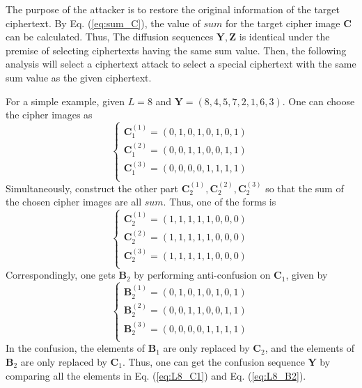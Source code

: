 \documentclass[final,3p,times,twocolumn]{elsarticle}
\begin{document}
The purpose of the attacker is to restore the original information of the target ciphertext. By Eq. (\ref{eq:sum_C}), the value of $sum$ for the target cipher image $\bm{C}$ can be calculated. Thus, The diffusion sequences $\bm{Y},\bm{Z}$ is identical under the premise of selecting ciphertexts having the same sum value. Then, the following analysis will select a ciphertext attack to select a special ciphertext with the same sum value as the given ciphertext.

For a simple example, given $L=8$ and $\bm{Y}=(8,4,5,7,2,1,6,3)$. One can choose the cipher images as
\begin{equation}
	\left\{ \begin{array}{l}
		\bm{C}_1^{(1)} = (0,1,0,1,0,1,0,1) \\
		\bm{C}_1^{(2)} = (0,0,1,1,0,0,1,1) \\
		\bm{C}_1^{(3)} = (0,0,0,0,1,1,1,1) \\
	\end{array} \right.
	\label{eq:L8_C1}
\end{equation}
Simultaneously, construct the other part $\bm{C}_2^{(1)},\bm{C}_2^{(2)},\bm{C}_2^{(3)}$ so that the sum of the chosen cipher images are all $sum$. Thus, one of the forms is
\begin{equation}
	\left\{ \begin{array}{l}
		\bm{C}_2^{(1)} = (1,1,1,1,1,0,0,0) \\
		\bm{C}_2^{(2)} = (1,1,1,1,1,0,0,0) \\
		\bm{C}_2^{(3)} = (1,1,1,1,1,0,0,0) \\
	\end{array} \right.
	\label{eq:L8_C2}
\end{equation}
Correspondingly, one gets $\bm{B}_2$ by performing anti-confusion on $\bm{C}_1$, given by
\begin{equation}
\left\{ \begin{array}{l}
\bm{B}_2^{(1)} = (0,1,0,1,0,1,0,1) \\
\bm{B}_2^{(2)} = (0,0,1,1,0,0,1,1) \\
\bm{B}_2^{(3)} = (0,0,0,0,1,1,1,1) \\
\end{array} \right.
\label{eq:L8_B2}
\end{equation}
In the confusion, the elements of $\bm{B}_1$ are only replaced by $\bm{C}_2$, and the elements of $\bm{B}_2$ are only replaced by $\bm{C}_1$. Thus, one can get the confusion sequence $\bm{Y}$ by comparing all the elements in Eq. (\ref{eq:L8_C1}) and Eq. (\ref{eq:L8_B2}).
\end{document}
